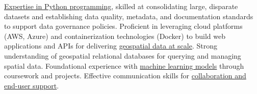 \documentclass[letterpaper]{article}
\newcommand{\impt}[1]{\uline{#1}}
\begin{document}
{\impt{Expertise in Python programming}, skilled at consolidating large,
disparate datasets and establishing data quality, metadata, and documentation standards to support data governance policies.
Proficient in leveraging cloud platforms (AWS, Azure) and containerization technologies (Docker) to build web
applications and APIs for delivering \impt{geospatial data at scale}.
Strong understanding of geospatial relational databases for querying and managing spatial data.
Foundational experience with \impt{machine learning models} through coursework and projects.
Effective communication skills for \impt{collaboration and end-user support}.
}
\end{document}

